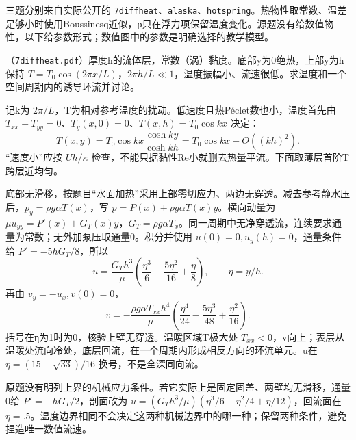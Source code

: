 三题分别来自实际公开的 \texttt{7diffheat}、\texttt{alaska}、\texttt{hotspring}。热物性取常数、温差足够小时使用Boussinesq近似，ρ只在浮力项保留温度变化。源题没有给数值物性，以下给参数形式；数值图中的参数是明确选择的教学模型。

\begin{exercise}\label{task:fluid-diffheat}
（\texttt{7diffheat.pdf}）厚度h的流体层，常数（涡）黏度。底部y为0绝热，上部y为h保持 $T=T_0\cos(2\pi x/L)$，$2\pi h/L\ll1$，温度振幅小、流速很低。求温度和一个空间周期内的诱导环流并讨论。
\end{exercise}
\begin{solution}
记k为 $2\pi/L$，T为相对参考温度的扰动。低速度且热Péclet数也小，温度首先由 $T_{xx}+T_{yy}=0$、$T_y(x,0)=0$、$T(x,h)=T_0\cos kx$ 决定：
\[
 T(x,y)=T_0\cos kx\frac{\cosh ky}{\cosh kh}
       =T_0\cos kx+O((kh)^2).
\]
“速度小”应按 $Uh/\kappa$ 检查，不能只据黏性Re小就删去热量平流。下面取薄层首阶T跨层近均匀。

底部无滑移，按题目“水面加热”采用上部零切应力、两边无穿透。减去参考静水压后，$p_y=\rho g\alpha T(x)$，写 $p=P(x)+\rho g\alpha T(x)y$。横向动量为 $\mu u_{yy}=P'(x)+G_T(x)y$，$G_T=\rho g\alpha T_x$。同一周期中无净穿透流，连续要求通量为常数；无外加泵压取通量0。积分并使用 $u(0)=0,u_y(h)=0$，通量条件给 $P'=-5hG_T/8$，所以
\[
 u=\frac{G_Th^3}{\mu}
       \left(\frac{\eta^3}{6}-\frac{5\eta^2}{16}+\frac\eta8\right),
 \qquad\eta=y/h.
\]
再由 $v_y=-u_x,v(0)=0$，
\[
 v=-\frac{\rho g\alpha T_{xx}h^4}{\mu}
       \left(\frac{\eta^4}{24}-\frac{5\eta^3}{48}+\frac{\eta^2}{16}\right).
\]
括号在η为1时为0，核验上壁无穿透。温暖区域T极大处 $T_{xx}<0$，v向上；表层从温暖处流向冷处，底层回流，在一个周期内形成相反方向的环流单元。u在 $\eta=(15-\sqrt{33})/16$ 换号，不是全深同向流。

原题没有明列上界的机械应力条件。若它实际上是固定固盖、两壁均无滑移，通量0给 $P'=-hG_T/2$，剖面改为 $u=(G_Th^3/\mu)(\eta^3/6-\eta^2/4+\eta/12)$，回流面在 $\eta=.5$。温度边界相同不会决定这两种机械边界中的哪一种；保留两种条件，避免捏造唯一数值流速。
\end{solution}

